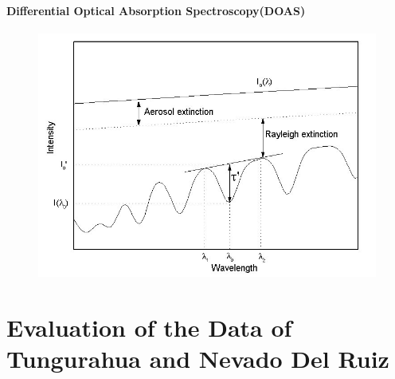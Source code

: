\documentclass  [
  paper    = a4,
  BCOR     = 10mm,
  twoside,
  fontsize = 12pt,
  fleqn,
  toc      = bibnumbered,
  toc      = listofnumbered,
  numbers  = noendperiod,
  headings = normal,
  listof   = leveldown,
  version  = 3.03
]                                       {scrreprt}
\begin{document}
	\subsection{Differential Optical Absorption Spectroscopy(DOAS)\label{DOAS}}
	\begin{figure}
		\centering
		\includegraphics[width=0.7\linewidth]{Bilder/Simon/Bilder_Tung/DOAS_Intensity}
		\caption{}
		\label{fig:doasintensity}
	\end{figure}
	
	\part{Evaluation of the Data of Tungurahua and Nevado Del Ruiz}
	
	
\end{document}
